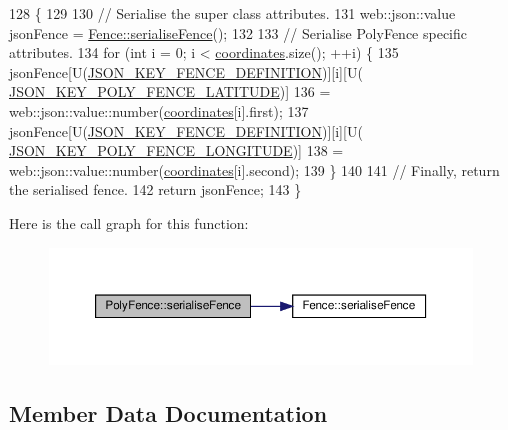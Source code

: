 \begin{DoxyCode}
128 \{
129 
130     \textcolor{comment}{// Serialise the super class attributes.}
131     web::json::value jsonFence = \hyperlink{class_fence_a5c8529e80a4444cc9ca0fb660cbf07c8}{Fence::serialiseFence}();
132 
133     \textcolor{comment}{// Serialise PolyFence specific attributes.}
134     \textcolor{keywordflow}{for} (\textcolor{keywordtype}{int} i = 0; i < \hyperlink{class_poly_fence_ae8e0c55e745979cab104ef80aeb4b418}{coordinates}.size(); ++i) \{
135         jsonFence[U(\hyperlink{_fence_8h_a698e69a18d481c1033ae9f7d6fb2e5b6}{JSON\_KEY\_FENCE\_DEFINITION})][i][U(
      \hyperlink{_poly_fence_8h_a9a8bf08118a4bda10ed5efe8cf534024}{JSON\_KEY\_POLY\_FENCE\_LATITUDE})]
136                 = web::json::value::number(\hyperlink{class_poly_fence_ae8e0c55e745979cab104ef80aeb4b418}{coordinates}[i].first);
137         jsonFence[U(\hyperlink{_fence_8h_a698e69a18d481c1033ae9f7d6fb2e5b6}{JSON\_KEY\_FENCE\_DEFINITION})][i][U(
      \hyperlink{_poly_fence_8h_a7411c3395f017461cb1bf07687ee4ef3}{JSON\_KEY\_POLY\_FENCE\_LONGITUDE})]
138                 = web::json::value::number(\hyperlink{class_poly_fence_ae8e0c55e745979cab104ef80aeb4b418}{coordinates}[i].second);
139     \}
140 
141     \textcolor{comment}{// Finally, return the serialised fence.}
142     \textcolor{keywordflow}{return} jsonFence;
143 \}
\end{DoxyCode}
Here is the call graph for this function\+:
\nopagebreak
\begin{figure}[H]
\begin{center}
\leavevmode
\includegraphics[width=350pt]{d1/d22/class_poly_fence_ae748da10e4fd15f87b74e0d996f00103_cgraph}
\end{center}
\end{figure}


\subsection{Member Data Documentation}
\mbox{\label{class_poly_fence_a24c99bb8a45f86bdf51cd3f22ef0f174}} 
